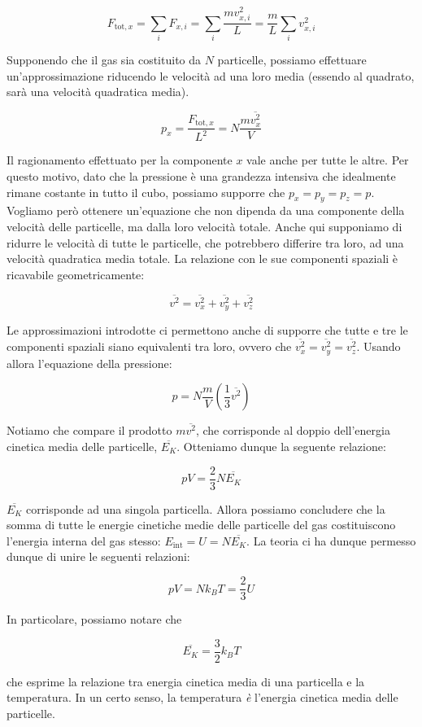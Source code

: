 \[ F_{\text{tot}, x} = \sum_i F_{x,i} = \sum_i \frac{mv_{x,i}^2}{L} = \frac{m}{L}\sum_i v_{x,i}^2 \]

Supponendo che il gas sia costituito da $N$ particelle, possiamo
effettuare un'approssimazione riducendo le velocità ad una loro media
(essendo al quadrato, sarà una velocità quadratica media).

\[ p_x = \frac{F_{\text{tot},x}}{L^2} = N\frac{m\overline{v_x^2}}{V} \]

Il ragionamento effettuato per la componente $x$ vale anche per tutte
le altre. Per questo motivo, dato che la pressione è una grandezza
intensiva che idealmente rimane costante in tutto il cubo, possiamo
supporre che $p_x = p_y = p_z = p$. Vogliamo però ottenere un'equazione
che non dipenda da una componente della velocità delle particelle,
ma dalla loro velocità totale. Anche qui supponiamo di ridurre le
velocità di tutte le particelle, che potrebbero differire tra loro,
ad una velocità quadratica media totale. La relazione con le sue
componenti spaziali è ricavabile geometricamente:

\[ \overline{v^2} = \overline{v_x^2} + \overline{v_y^2} + \overline{v_z^2} \]

\noindent Le approssimazioni introdotte ci permettono anche di
supporre che tutte e tre le componenti spaziali siano equivalenti
tra loro, ovvero che $\overline{v_x^2} = \overline{v_y^2} = \overline{v_z^2}$.
Usando allora l'equazione della pressione:

\[ p = N\frac{m}{V}\left(\frac13 \overline{v^2}\right) \]

\noindent Notiamo che compare il prodotto $m\overline{v^2}$, che
corrisponde al doppio dell'energia cinetica media delle particelle,
$\overline{E_K}$. Otteniamo dunque la seguente relazione:

\[ pV = \frac23 N\overline{E_K} \]

\noindent $\overline{E_K}$ corrisponde ad una singola particella.
Allora possiamo concludere che la somma di tutte le energie cinetiche
medie delle particelle del gas costituiscono l'energia interna del
gas stesso: $E_\text{int} = U = N\overline{E_K}$.
La teoria ci ha dunque permesso dunque di unire le seguenti relazioni:

\[ pV = Nk_BT = \frac23 U \]

In particolare, possiamo notare che

\[ \overline{E_K} = \frac{3}{2}k_B T \]

\noindent che esprime la relazione tra energia cinetica media di una
particella e la temperatura. In un certo senso, la temperatura \textit{è}
l'energia cinetica media delle particelle.

